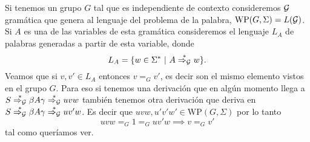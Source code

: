\documentclass[tesis.tex]{subfiles}
\newcommand{\WP}{\text{WP}(G, \Sigma)}
\newcommand{\deriva}{\overset{*}{\Rightarrow_{\cal G}}}
\begin{document}
\begin{obs}\label{palabras-wp}
Si tenemos un grupo $G$ tal que es independiente de contexto consideremos $\cal G$ gramática que genera al lenguaje del problema de la palabra, $\WP = L(\cal G)$.
Si $A$ es una de las variables de esta gramática consideremos el lenguaje $L_A$ de palabras generadas a partir de esta variable, donde
\[
L_A = \{ w \in \Sigma^*  \ | \ A \deriva w  \}.
\]
Veamos que si $v,v' \in L_A$ entonces $v =_G v'$, es decir son el mismo elemento vistos en el grupo $G$. 
Para eso si tenemos una derivación que en algún momento llega a $S \deriva \beta A \gamma \deriva uvw$ también tenemos otra derivación que deriva en $S \deriva \beta A \gamma  \deriva uv'w$. 
Es decir que $uvw, u'v'w' \in \WP$ por lo tanto 
\begin{equation*}
	uvw =_G 1 =_G uv'w \implies v =_G v'
\end{equation*}
tal como queríamos ver.
\end{obs}
\end{document}
